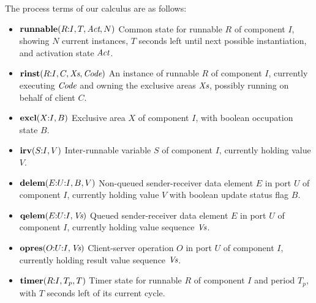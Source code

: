 \documentclass[twocolumn]{article}
\newcommand{\V}[1]{\mbox{\it #1}}
\newcommand{\Code}{\V{Code}}
\newcommand{\Act}{\V{Act}}
\newcommand{\Xs}{\V{Xs}}
\newcommand{\Vs}{\V{Vs}}
\newcommand{\seq}[2]{#1\hspace{-0.7ex}:\hspace{-0.7ex}#2}
\newcommand{\seqq}[3]{#1\hspace{-0.7ex}:\hspace{-0.7ex}#2\hspace{-0.7ex}:\hspace{-0.7ex}#3}
\newcommand{\runnable}[4]{\mbox{\bf runnable}(#1,#2,#3,#4)}
\newcommand{\rinst}[4]{\mbox{\bf rinst}(#1,#2,#3,#4)}
\newcommand{\excl}[2]{\mbox{\bf excl}(#1,#2)}
\newcommand{\irv}[2]{\mbox{\bf irv}(#1,#2)}
\newcommand{\qelem}[2]{\mbox{\bf qelem}(#1,#2)}
\newcommand{\delem}[3]{\mbox{\bf delem}(#1,#2,#3)}
\newcommand{\opres}[2]{\mbox{\bf opres}(#1,#2)}
\newcommand{\timer}[3]{\mbox{\bf timer}(#1,#2, #3)}
\begin{document}
The process terms of our calculus are as follows:
\begin{itemize}
\item $\runnable{\seq{R}{I}}{T}{\Act}{N}$  \newline
Common state for runnable $R$ of component $I$, showing $N$ current instances, $T$ seconds left until next possible instantiation, and activation state $\Act$.
\item $\rinst{\seq{R}{I}}{C}{\Xs}{\Code}$ \newline
An instance of runnable $R$ of component $I$, currently executing $\Code$ and owning the exclusive areas $\Xs$, possibly running on behalf of client $C$.
\item $\excl{\seq{X}{I}}{B}$ \newline
Exclusive area $X$ of component $I$, with boolean occupation state $B$.
\item $\irv{\seq{S}{I}}{V}$ \newline
Inter-runnable variable $S$ of component $I$, currently holding value $V$.
\item $\delem{\seqq{E}{U}{I}}{B}{V}$ \newline
Non-queued sender-receiver data element $E$ in port $U$ of component $I$, currently holding value $V$ with boolean update status flag $B$.
\item $\qelem{\seqq{E}{U}{I}}{\Vs}$ \newline
Queued sender-receiver data element $E$ in port $U$ of component $I$, currently holding value sequence $\Vs$.
\item $\opres{\seqq{O}{U}{I}}{\Vs}$ \newline
Client-server operation $O$ in port $U$ of component $I$, currently holding result value sequence $\Vs$.
\item $\timer{\seq{R}{I}}{T_p}{T}$ \newline
Timer state for runnable $R$ of component $I$ and period $T_p$, with $T$ seconds left of its current cycle.
\end{itemize}
\end{document}
